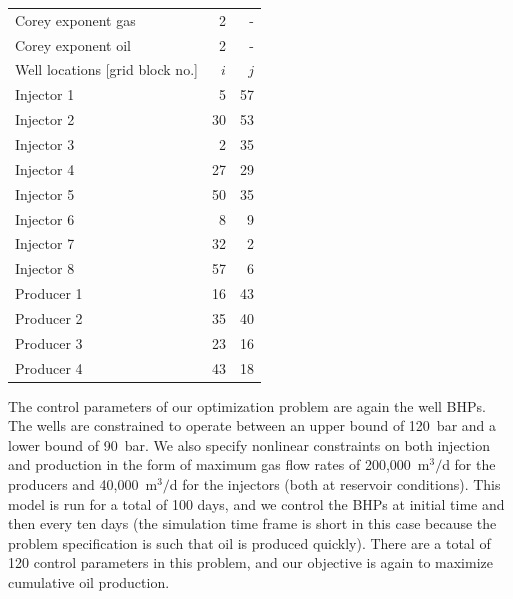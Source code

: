 \documentclass[twocolumn,numbook]{svjour3}          %
\begin{document}
\begin{table}
\begin{tabular}{|l|rr|}
Corey exponent gas       & 2 & -                             \\
Corey exponent oil       & 2 & -                             \\
      \hline\hline
Well locations [grid block no.] & $i$ & $j$                      \\
\hline
Injector 1               &  5 &  57                          \\
Injector 2               &  30&  53                          \\
Injector 3               &   2&  35                          \\
Injector 4               &  27&  29                          \\
Injector 5               &  50&  35                          \\
Injector 6               &   8&   9                          \\
Injector 7               &  32&   2                          \\
Injector 8               &  57&   6                          \\
Producer 1               &  16&  43                          \\
Producer 2               &  35&  40                          \\
Producer 3               &  23&  16                          \\
Producer 4               &  43&  18                          \\
\hline
\end{tabular}
\label{table:VanEssenModelReservoir}
\end{table}


The control parameters of our optimization problem are again the well BHPs.  The
wells are constrained to operate between an upper bound of 120~bar and a lower
bound of 90~bar. We also specify nonlinear constraints on both injection and
production in the form of maximum gas flow
rates of 200,000~m$^3/$d for the producers and 40,000~m$^3/$d for the injectors
(both at reservoir conditions). This model is run for a total of 100 days, and
we control the BHPs at initial time and then every ten days (the simulation time
frame is short in this case because the problem specification is such that oil
is produced quickly). There are a total of 120 control parameters in this
problem, and our objective is again to maximize cumulative oil production.
\end{document}
